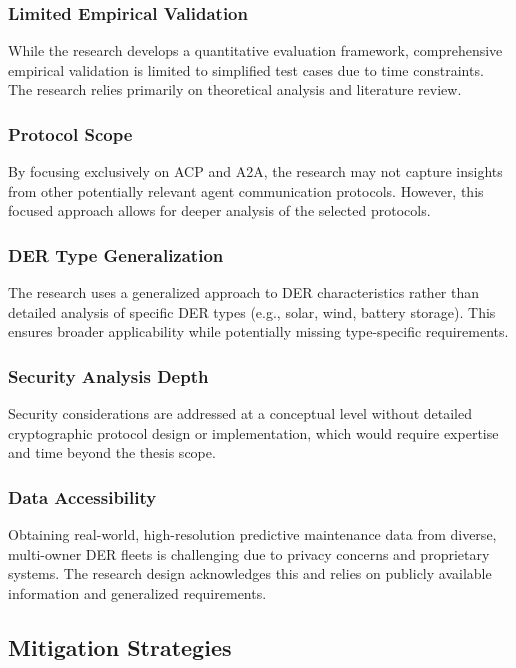 \documentclass[12pt,a4paper]{article}
\begin{document}
\subsubsection{Limited Empirical Validation}
While the research develops a quantitative evaluation framework, comprehensive empirical validation is limited to simplified test cases due to time constraints. The research relies primarily on theoretical analysis and literature review.

\subsubsection{Protocol Scope}
By focusing exclusively on ACP and A2A, the research may not capture insights from other potentially relevant agent communication protocols. However, this focused approach allows for deeper analysis of the selected protocols.

\subsubsection{DER Type Generalization}
The research uses a generalized approach to DER characteristics rather than detailed analysis of specific DER types (e.g., solar, wind, battery storage). This ensures broader applicability while potentially missing type-specific requirements.

\subsubsection{Security Analysis Depth}
Security considerations are addressed at a conceptual level without detailed cryptographic protocol design or implementation, which would require expertise and time beyond the thesis scope.

\subsubsection{Data Accessibility}
Obtaining real-world, high-resolution predictive maintenance data from diverse, multi-owner DER fleets is challenging due to privacy concerns and proprietary systems. The research design acknowledges this and relies on publicly available information and generalized requirements.

\subsection{Mitigation Strategies}
\end{document}

